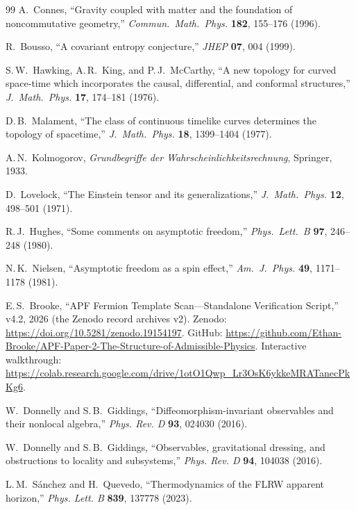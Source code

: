 \documentclass[11pt]{article}
\theoremstyle{definition}
\begin{document}
\begin{thebibliography}{99}
A.~Connes, ``Gravity coupled with matter and the foundation of
noncommutative geometry,''
\textit{Commun.\ Math.\ Phys.} \textbf{182}, 155--176 (1996).

R.~Bousso, ``A covariant entropy conjecture,''
\textit{JHEP} \textbf{07}, 004 (1999).

S.\,W.~Hawking, A.\,R.~King, and P.\,J.~McCarthy,
``A new topology for curved space-time which incorporates the causal,
differential, and conformal structures,''
\textit{J.\ Math.\ Phys.} \textbf{17}, 174--181 (1976).

D.\,B.~Malament, ``The class of continuous timelike curves determines
the topology of spacetime,''
\textit{J.\ Math.\ Phys.} \textbf{18}, 1399--1404 (1977).

A.\,N.~Kolmogorov, \textit{Grundbegriffe der Wahrscheinlichkeitsrechnung},
Springer, 1933.

D.~Lovelock, ``The Einstein tensor and its generalizations,''
\textit{J.\ Math.\ Phys.} \textbf{12}, 498--501 (1971).

R.\,J.~Hughes, ``Some comments on asymptotic freedom,''
\textit{Phys.\ Lett.\ B} \textbf{97}, 246--248 (1980).

N.\,K.~Nielsen, ``Asymptotic freedom as a spin effect,''
\textit{Am.\ J.\ Phys.} \textbf{49}, 1171--1178 (1981).

E.\,S.~Brooke, ``APF Fermion Template Scan---Standalone Verification
Script,'' v4.2, 2026 (the Zenodo record archives v2).
Zenodo: \url{https://doi.org/10.5281/zenodo.19154197}.
GitHub: \url{https://github.com/Ethan-Brooke/APF-Paper-2-The-Structure-of-Admissible-Physics}.
Interactive walkthrough:
\url{https://colab.research.google.com/drive/1otO1Qwp_Lr3OsK6ykkeMRATanecPkKg6}.

W.~Donnelly and S.\,B.~Giddings, ``Diffeomorphism-invariant observables
and their nonlocal algebra,'' \textit{Phys. Rev. D} \textbf{93}, 024030
(2016).

W.~Donnelly and S.\,B.~Giddings, ``Observables, gravitational dressing,
and obstructions to locality and subsystems,'' \textit{Phys. Rev. D}
\textbf{94}, 104038 (2016).

L.\,M.~S\'anchez and H.~Quevedo, ``Thermodynamics of the FLRW apparent
horizon,'' \textit{Phys. Lett. B} \textbf{839}, 137778 (2023).

\end{thebibliography}
\end{document}
